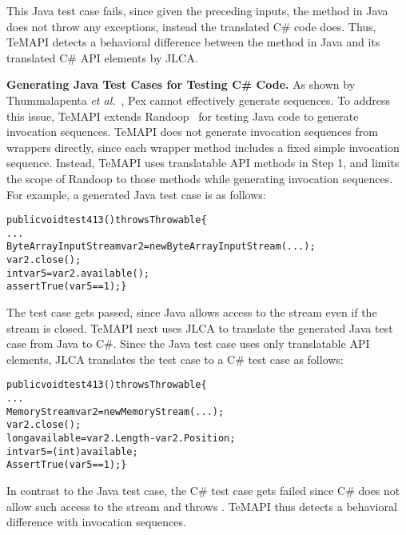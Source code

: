This Java test case fails, since given the preceding inputs, the  method in Java does not throw any exceptions, instead the translated C\# code does. Thus, TeMAPI detects a behavioral difference between the  method in Java and its translated C\# API elements by JLCA.

\textbf{Generating Java Test Cases for Testing C\# Code.} As shown by Thummalapenta \emph{et al.}~\cite{thummalapenta09:mseqgen}, Pex cannot effectively generate sequences. To address this issue, TeMAPI extends Randoop~\cite{pacheco2007feedback} for testing Java code to generate invocation sequences. TeMAPI does not generate invocation sequences from wrappers directly, since each wrapper method includes a fixed simple invocation sequence. Instead, TeMAPI uses translatable API methods in Step 1, and limits the scope of Randoop to those methods while generating invocation sequences. For example, a generated Java test case is as follows:

\begin{CodeOut}\vspace*{-1.5ex}
\begin{alltt}
public void test413() throws Throwable\{
  ...
  ByteArrayInputStream var2=new ByteArrayInputStream(...);
  var2.close();
  int var5=var2.available();
  assertTrue(var5 == 1);\}
\end{alltt}
\end{CodeOut}\vspace*{-2ex}


The test case gets passed, since Java allows access to the stream even if the stream is closed. TeMAPI next uses JLCA to translate the generated Java test case from Java to C\#. Since the Java test case uses only translatable API elements, JLCA translates the test case to a C\# test case as follows:

\begin{CodeOut}\vspace*{-1.5ex}
\begin{alltt}
public void test413() throws Throwable\{
  ...
  MemoryStream var2 = new MemoryStream(...);
  var2.close();
  long available = var2.Length - var2.Position;
  int var5 = (int) available;
  AssertTrue(var5 == 1);\}
\end{alltt}
\end{CodeOut}\vspace*{-2ex}

In contrast to the Java test case, the C\# test case gets failed since C\# does not allow such access to the stream and throws . TeMAPI thus detects a behavioral difference with invocation sequences.

